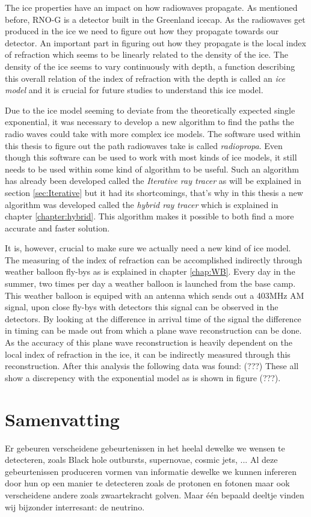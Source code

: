 \documentclass[11pt,a4paper,faculty=we,language=en,doctype=report]{cls/ugent-doc}
\begin{document}
The ice properties have an impact on how radiowaves propagate. As mentioned before, RNO-G is a detector built
in the Greenland icecap. As the radiowaves get produced in the ice we need to figure out how
they propagate towards our detector. An important part in figuring out how they propagate is 
the local index of refraction which seems to be linearly related to the density of the ice. 
The density of the ice seems to vary continuously with depth, a function describing
this overall relation of the index of refraction with the depth is called an \textit{ice model}
and it is crucial for future studies to understand this ice model.

Due to the ice model seeming to deviate from the theoretically expected single exponential, it was necessary to 
develop a new algorithm to find the paths the radio waves could take with more complex ice models. 
The software used within this thesis to figure out the path radiowaves take is called \textit{radiopropa}.
Even though this software can be used to work with most kinds of ice models, it still needs to be used within
some kind of algorithm to be useful. Such an algorithm has already been developed called the \textit{Iterative
ray tracer} as will be explained in section \ref{sec:Iterative} but it had its shortcomings,
that's why in this thesis a new algorithm was developed called the \textit{hybrid ray tracer} which is explained
in chapter \ref{chapter:hybrid}. This algorithm makes it possible to both find a more accurate and faster solution.

It is, however, crucial to make sure we actually need a new kind of ice model. The measuring of the index of refraction
can be accomplished indirectly through weather balloon fly-bys as is explained in chapter \ref{chap:WB}. Every day
in the summer, two times per day a weather balloon is launched from the base camp. This weather balloon is equiped with
an antenna which sends out a 403MHz AM signal, upon close fly-bys with detectors this signal can be observed in the
detectors. By looking at the difference in arrival time of the signal the difference in timing can be made out from 
which a plane wave reconstruction can be done. As the accuracy of this plane wave reconstruction is heavily dependent
on the local index of refraction in the ice, it can be indirectly measured through this reconstruction.
After this analysis the following data was found:
(???)
These all show a discrepency with the exponential model as is shown in figure (???). 

\newpage
\chapter*{Samenvatting}
Er gebeuren verscheidene gebeurtenissen in het heelal dewelke we wensen
te detecteren, zoals Black hole outbursts, supernovae, cosmic jets, ...
Al deze gebeurtenissen produceren vormen van informatie dewelke we kunnen
infereren door hun op een manier te detecteren zoals de protonen en fotonen
maar ook verscheidene andere zoals zwaartekracht golven.
Maar één bepaald deeltje vinden wij bijzonder interresant: de neutrino.
\end{document}
